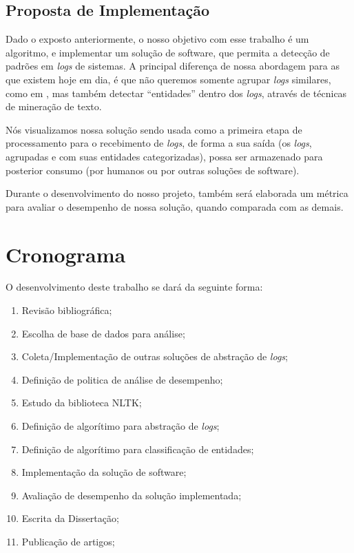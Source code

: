 \documentclass[
	12pt,				%
	openright,			%
	twoside,			%
	a4paper,			%
	english,			%
	spanish,			%
	brazil,				%
	]{abntex2}
\begin{document}
\section{Proposta de Implementação}\label{sec:implementacao}

Dado o exposto anteriormente, o nosso objetivo com esse trabalho é um algoritmo, e implementar um solução de software, que permita a detecção de padrões em \emph{logs} de sistemas. A principal diferença de nossa abordagem para as que existem hoje em dia, é que não queremos somente agrupar \emph{logs} similares, como em \cite{vaarandi2003data}, mas também detectar ``entidades'' dentro dos \emph{logs}, através de técnicas de mineração de texto.

Nós visualizamos nossa solução sendo usada como a primeira etapa de processamento para o recebimento de \emph{logs}, de forma a sua saída (os \emph{logs}, agrupadas e com suas entidades categorizadas), possa ser armazenado para posterior consumo (por humanos ou por outras soluções de software).

Durante o desenvolvimento do nosso projeto, também será elaborada um métrica para avaliar o desempenho de nossa solução, quando comparada com as demais.


\chapter{Cronograma}\label{chap:cronograma}

O desenvolvimento deste trabalho se dará da seguinte forma:

\begin{enumerate}
	\item \label{rev-bibli} Revisão bibliográfica;
	\item \label{esc-base} Escolha de base de dados para análise;
	\item \label{imp-outras} Coleta/Implementação de outras soluções de abstração de \emph{logs};
	\item \label{def-pol} Definição de politica de análise de desempenho;
	\item \label{est-nltk} Estudo da biblioteca NLTK;
	\item \label{algo-abs} Definição de algorítimo para abstração de \emph{logs};
	\item \label{algo-clas} Definição de algorítimo para classificação de entidades;
	\item \label{imp-sol} Implementação da solução de software;
	\item \label{ava-des} Avaliação de desempenho da solução implementada;
	\item \label{esc-dis} Escrita da Dissertação;
	\item \label{pub-art} Publicação de artigos;	
\end{enumerate}
\end{document}
